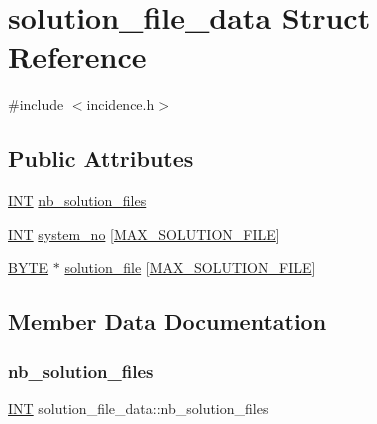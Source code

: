 \hypertarget{structsolution__file__data}{}\section{solution\+\_\+file\+\_\+data Struct Reference}
\label{structsolution__file__data}


{\ttfamily \#include $<$incidence.\+h$>$}

\subsection*{Public Attributes}
\begin{DoxyCompactItemize}
\item 
\mbox{\hyperlink{galois_8h_a09fddde158a3a20bd2dcadb609de11dc}{I\+NT}} \mbox{\hyperlink{structsolution__file__data_a47ef5e80b8f7788653de808157553949}{nb\+\_\+solution\+\_\+files}}
\item 
\mbox{\hyperlink{galois_8h_a09fddde158a3a20bd2dcadb609de11dc}{I\+NT}} \mbox{\hyperlink{structsolution__file__data_a2a87003e4de87213c91d4921ad3277c0}{system\+\_\+no}} \mbox{[}\mbox{\hyperlink{incidence_8h_a079de7c96ad5c6ac9d5b822a943460f7}{M\+A\+X\+\_\+\+S\+O\+L\+U\+T\+I\+O\+N\+\_\+\+F\+I\+LE}}\mbox{]}
\item 
\mbox{\hyperlink{galois_8h_ab6cc7b4aeb6ea31aba2b3fbfc83ff5e6}{B\+Y\+TE}} $\ast$ \mbox{\hyperlink{structsolution__file__data_a82f0ae0a469889fb85a8526613585ef8}{solution\+\_\+file}} \mbox{[}\mbox{\hyperlink{incidence_8h_a079de7c96ad5c6ac9d5b822a943460f7}{M\+A\+X\+\_\+\+S\+O\+L\+U\+T\+I\+O\+N\+\_\+\+F\+I\+LE}}\mbox{]}
\end{DoxyCompactItemize}


\subsection{Member Data Documentation}
\mbox{\label{structsolution__file__data_a47ef5e80b8f7788653de808157553949}} 
\subsubsection{\texorpdfstring{nb\+\_\+solution\+\_\+files}{nb\_solution\_files}}
{\footnotesize\ttfamily \mbox{\hyperlink{galois_8h_a09fddde158a3a20bd2dcadb609de11dc}{I\+NT}} solution\+\_\+file\+\_\+data\+::nb\+\_\+solution\+\_\+files}

